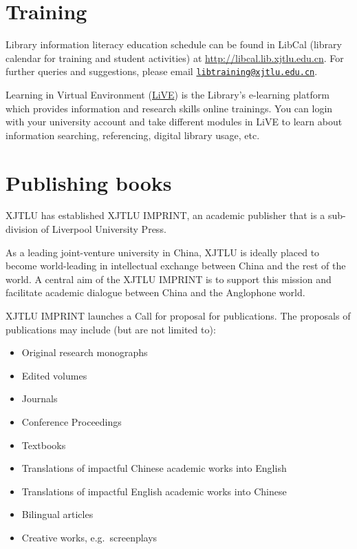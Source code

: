 \documentclass[
]{book}
\providecommand{\tightlist}{%
  \setlength{\itemsep}{0pt}\setlength{\parskip}{0pt}}
\begin{document}
\hypertarget{training}{%
\section{Training}\label{training}}

Library information literacy education schedule can be found in LibCal (library calendar for training and student activities) at \url{http://libcal.lib.xjtlu.edu.cn}. For further queries and suggestions, please email \href{mailto:libtraining@xjtlu.edu.cn}{\nolinkurl{libtraining@xjtlu.edu.cn}}.

Learning in Virtual Environment (\href{http://vle.lib.xjtlu.edu.cn}{LiVE}) is the Library's e-learning platform which provides information and research skills online trainings. You can login with your university account and take different modules in LiVE to learn about information searching, referencing, digital library usage, etc.

\hypertarget{publishing-books}{%
\section{Publishing books}\label{publishing-books}}

XJTLU has established XJTLU IMPRINT, an academic publisher that is a sub-division of Liverpool University Press.

As a leading joint-venture university in China, XJTLU is ideally placed to become world-leading in intellectual exchange between China and the rest of the world. A central aim of the XJTLU IMPRINT is to support this mission and facilitate academic dialogue between China and the Anglophone world.

XJTLU IMPRINT launches a Call for proposal for publications. The proposals of publications may include (but are not limited to):

\begin{itemize}
\tightlist
\item
  Original research monographs
\item
  Edited volumes
\item
  Journals
\item
  Conference Proceedings\\
\item
  Textbooks
\item
  Translations of impactful Chinese academic works into English
\item
  Translations of impactful English academic works into Chinese
\item
  Bilingual articles\\
\item
  Creative works, e.g.~screenplays
\end{itemize}
\end{document}
